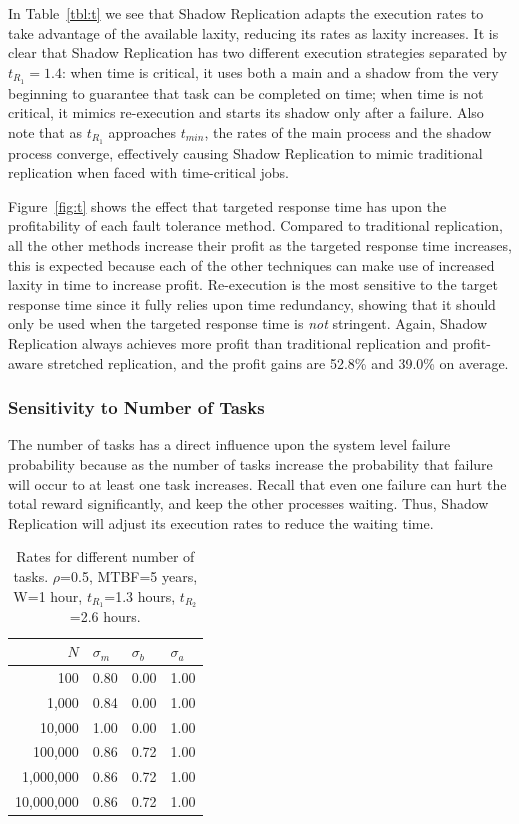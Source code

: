 In Table~\ref{tbl:t} we see that Shadow Replication adapts the execution
rates to take advantage of the available laxity, reducing its rates
as laxity increases. It is clear that Shadow Replication has two different execution strategies separated by $t_{R_1}=1.4$: when time is critical, it uses both a main and a shadow from the very beginning to guarantee that task can be completed on time; when time is not critical, it mimics re-execution and starts its shadow only after a failure.
Also note that as $t_{R_1}$
approaches $t_{min}$, the rates of the main process and the shadow process
converge, effectively causing Shadow Replication to mimic traditional
replication when faced with time-critical jobs.

Figure~\ref{fig:t} shows the effect that targeted response time has upon
the profitability of each fault tolerance method. Compared to traditional replication, all the other methods increase their profit as the targeted
response time increases, this is expected because each of the other
techniques can make use of increased laxity in time to increase
profit. Re-execution is the most sensitive to the target response
time since it fully relies upon time redundancy, showing that it should only be used when the targeted response time is \emph{not} stringent. 
Again, Shadow Replication always achieves more profit than traditional
replication and profit-aware stretched replication, and the profit
gains are 52.8\% and 39.0\% on average. 


\subsubsection{Sensitivity to Number of Tasks}
The number of tasks has a direct influence upon the system level
failure probability because as the number of tasks increase the
probability that failure will occur to at least one task
increases. Recall that even one failure can hurt the total reward
significantly, and keep the other processes waiting. Thus, Shadow
Replication will adjust its execution rates to reduce the waiting
time.

\begin{table}[!h]\small
	\caption{Rates for different number of tasks. $\rho$=0.5, MTBF=5 years, W=1 hour, $t_{R_1}$=1.3 hours, $t_{R_2}$=2.6 hours.}
	\centering
		\begin{tabular}{|r|p{1cm}|p{1cm}|p{1cm}|}
		\hline
		$N$ & $\sigma_m$ & $\sigma_b$ & $\sigma_a$ \\
		\hline
		100			&	0.80	&	0.00	&	1.00 \\
		\hline
		1,000		&	0.84	&	0.00	&	1.00 \\
		\hline
		10,000		&	1.00	&	0.00	&	1.00 \\
		\hline
		100,000		&	0.86	&	0.72	&	1.00 \\
		\hline
		1,000,000		&	0.86	&	0.72	&	1.00 \\
		\hline
		10,000,000	&	0.86	&	0.72	&   1.00 \\
		\hline
		\end{tabular}
	\label{tbl:n}
\end{table}

